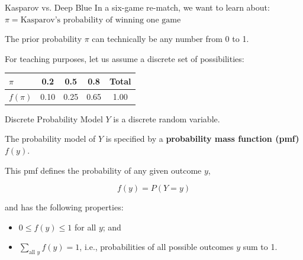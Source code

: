 \documentclass[12pt]{beamer}
\begin{document}
\begin{frame}{}
\begin{block}{Kasparov vs. Deep Blue}
In a six-game re-match, we want to learn about:\\
$\pi = \text{Kasparov's probability of winning one game}$

\vspace{0.25cm}
The prior probability $\pi$ can technically be any number from 0 to 1.

\vspace{0.25cm}
For teaching purposes, let us assume a discrete set of possibilities:
\begin{center}
\begin{tabular}{lcccc}
\toprule
$\pi$ & 0.2 & 0.5 & 0.8 & Total \\
\midrule
$f(\pi)$ & 0.10 & 0.25 & 0.65 & 1.00 \\
\bottomrule
\end{tabular}

\vspace{0.25cm}
\end{center}
\end{block}
\end{frame}

\begin{frame}{}
\small
\begin{block}{Discrete Probability Model}
$Y$ is a discrete random variable.

\vspace{0.25cm}
The probability model of $Y$ is specified by a \textbf{probability mass function (pmf)} $f(y)$.

\vspace{0.25cm}
This pmf defines the probability of any given outcome $y$,

\[
f(y) = P(Y = y)
\]

and has the following properties:

\begin{itemize}
\item $0 \leq f(y) \leq 1$ for all $y$; and
\item $\displaystyle \sum_{\text{all } y} f(y) = 1$, i.e.,
probabilities of all possible outcomes $y$ sum to 1.
\end{itemize}
\end{block}
\end{frame}
\end{document}
